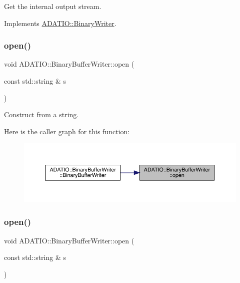 Get the internal output stream. 



Implements \mbox{\hyperlink{classADATIO_1_1BinaryWriter_a4fe227341d17d012bb83a070c208dac0}{A\+D\+A\+T\+I\+O\+::\+Binary\+Writer}}.

\mbox{\label{classADATIO_1_1BinaryBufferWriter_a394d7bf949c4def18697af392fb217a5}} 
\subsubsection{\texorpdfstring{open()}{open()}\hspace{0.1cm}{\footnotesize\ttfamily [1/2]}}
{\footnotesize\ttfamily void A\+D\+A\+T\+I\+O\+::\+Binary\+Buffer\+Writer\+::open (\begin{DoxyParamCaption}\item[{const std\+::string \&}]{s }\end{DoxyParamCaption})}



Construct from a string. 

Here is the caller graph for this function\+:\nopagebreak
\begin{figure}[H]
\begin{center}
\leavevmode
\includegraphics[width=350pt]{d8/d90/classADATIO_1_1BinaryBufferWriter_a394d7bf949c4def18697af392fb217a5_icgraph}
\end{center}
\end{figure}
\mbox{\label{classADATIO_1_1BinaryBufferWriter_a394d7bf949c4def18697af392fb217a5}} 
\subsubsection{\texorpdfstring{open()}{open()}\hspace{0.1cm}{\footnotesize\ttfamily [2/2]}}
{\footnotesize\ttfamily void A\+D\+A\+T\+I\+O\+::\+Binary\+Buffer\+Writer\+::open (\begin{DoxyParamCaption}\item[{const std\+::string \&}]{s }\end{DoxyParamCaption})}



